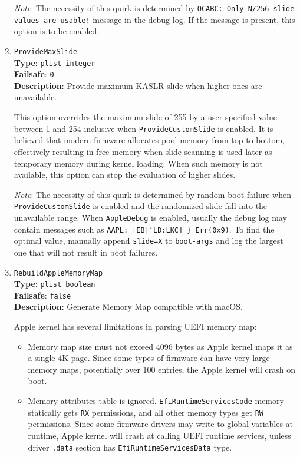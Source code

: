 \documentclass[]{article}
\providecommand{\tightlist}{%
  \setlength{\itemsep}{0pt}\setlength{\parskip}{0pt}}
\begin{document}
\begin{enumerate}
  \emph{Note}: The necessity of this quirk is determined by \texttt{OCABC: Only N/256
  slide values are usable!} message in the debug log. If the message is present,
  this option is to be enabled.

\item
  \texttt{ProvideMaxSlide}\\
  \textbf{Type}: \texttt{plist\ integer}\\
  \textbf{Failsafe}: \texttt{0}\\
  \textbf{Description}: Provide maximum KASLR slide when higher ones are unavailable.

  This option overrides the maximum slide of 255 by a user specified value between 1 and 254 inclusive
  when \texttt{ProvideCustomSlide} is enabled.
  It is believed that modern firmware allocates pool memory from top to bottom, effectively resulting in
  free memory when slide scanning is used later as temporary memory during kernel loading.
  When such memory is not available, this option can stop the evaluation of higher slides.

  \emph{Note}: The necessity of this quirk is determined by random boot failure
  when \texttt{ProvideCustomSlide} is enabled and the randomized slide fall
  into the unavailable range. When \texttt{AppleDebug} is enabled, usually the
  debug log may contain messages such as \texttt{AAPL: [EB|`LD:LKC] \} Err(0x9)}.
  To find the optimal value, manually append \texttt{slide=X} to \texttt{boot-args}
  and log the largest one that will not result in boot failures.

\item
  \texttt{RebuildAppleMemoryMap}\\
  \textbf{Type}: \texttt{plist\ boolean}\\
  \textbf{Failsafe}: \texttt{false}\\
  \textbf{Description}: Generate Memory Map compatible with macOS.

  Apple kernel has several limitations in parsing UEFI memory map:

  \begin{itemize}
  \tightlist
  \item Memory map size must not exceed 4096 bytes as Apple kernel maps
    it as a single 4K page. Since some types of firmware can have very large memory maps,
    potentially over 100 entries, the Apple kernel will crash on boot.
  \item Memory attributes table is ignored. \texttt{EfiRuntimeServicesCode}
    memory statically gets \texttt{RX} permissions, and all other memory types
    get \texttt{RW} permissions. Since some firmware drivers may write to global
    variables at runtime, Apple kernel will crash at calling UEFI runtime services,
    unless driver \texttt{.data} section has \texttt{EfiRuntimeServicesData}
    type.
  \end{itemize}


\end{enumerate}
\end{document}
